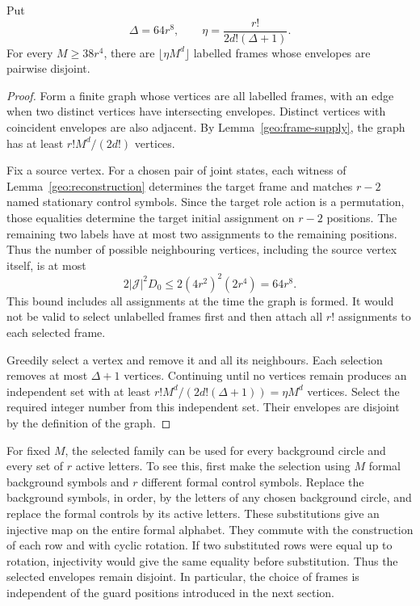 \begin{lemma}
\label{geo:labelled-packing}
Put
\[
 \Delta=64r^8,
 \qquad \eta=\frac{r!}{2d!(\Delta+1)}.
\]
For every $M\geq38r^4$, there are
$\lfloor\eta M^d\rfloor$ labelled frames whose envelopes are pairwise
disjoint.
\end{lemma}
\begin{proof}
Form a finite graph whose vertices are all labelled frames, with an edge
when two distinct vertices have intersecting envelopes. Distinct vertices
with coincident envelopes are also adjacent. By
Lemma~\ref{geo:frame-supply}, the graph has at least
$r!M^d/(2d!)$ vertices.

Fix a source vertex. For a chosen pair of joint states, each witness of
Lemma~\ref{geo:reconstruction} determines the target frame and matches
$r-2$ named stationary control symbols. Since the target role action is
a permutation, those equalities determine the target initial assignment
on $r-2$ positions. The remaining two labels have at most two assignments
to the remaining positions. Thus the number of possible neighbouring
vertices, including the source vertex itself, is at most
\[
 2|\mathcal J|^2D_0\leq2(4r^2)^2(2r^4)=64r^8.
\]
This bound includes all assignments at the time the graph is formed. It
would not be valid to select unlabelled frames first and then attach all
$r!$ assignments to each selected frame.

Greedily select a vertex and remove it and all its neighbours. Each
selection removes at most $\Delta+1$ vertices. Continuing until no
vertices remain produces an independent set with at least
$r!M^d/(2d!(\Delta+1))=\eta M^d$ vertices. Select the required integer
number from this independent set. Their envelopes are disjoint by the
definition of the graph.
\end{proof}

For fixed $M$, the selected family can be used for every background circle
and every set of $r$ active letters. To see this, first make the selection
using $M$ formal background symbols and $r$ different formal control
symbols. Replace the background symbols, in order, by the letters of any
chosen background circle, and replace the formal controls by its active
letters. These substitutions give an injective map on the entire formal
alphabet. They commute with the construction of each row and with cyclic
rotation. If two substituted rows were equal up to rotation, injectivity
would give the same equality before substitution. Thus the selected
envelopes remain disjoint. In particular, the choice of frames is
independent of the guard positions introduced in the next section.

